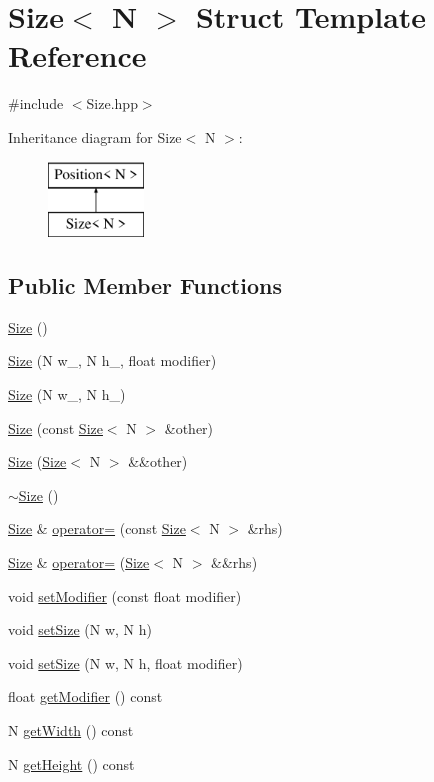 \hypertarget{struct_size}{\section{Size$<$ N $>$ Struct Template Reference}
\label{struct_size}
}


{\ttfamily \#include $<$Size.\-hpp$>$}

Inheritance diagram for Size$<$ N $>$\-:\begin{figure}[H]
\begin{center}
\leavevmode
\includegraphics[height=2.000000cm]{struct_size}
\end{center}
\end{figure}
\subsection*{Public Member Functions}
\begin{DoxyCompactItemize}
\item 
\hyperlink{struct_size_af17421be7acae6d13fc4670f04854de6}{Size} ()
\item 
\hyperlink{struct_size_abf87d26cd771b7fa7b7e3f37acd3e076}{Size} (N w\-\_\-, N h\-\_\-, float modifier)
\item 
\hyperlink{struct_size_aebc8ee17587db4f84c8d9085f27a761d}{Size} (N w\-\_\-, N h\-\_\-)
\item 
\hyperlink{struct_size_ae90aed86840a6650d6ee3d5897afe148}{Size} (const \hyperlink{struct_size}{Size}$<$ N $>$ \&other)
\item 
\hyperlink{struct_size_a31ee38aed5f689000e9fb7415b2f60ce}{Size} (\hyperlink{struct_size}{Size}$<$ N $>$ \&\&other)
\item 
\hyperlink{struct_size_a5a4e62203d653f23e3d88e966b86e3a5}{$\sim$\-Size} ()
\item 
\hyperlink{struct_size}{Size} \& \hyperlink{struct_size_aa0067a04662b093f532b9ebec3175f66}{operator=} (const \hyperlink{struct_size}{Size}$<$ N $>$ \&rhs)
\item 
\hyperlink{struct_size}{Size} \& \hyperlink{struct_size_a7837d5a7b300e0e0052d21e8638361b1}{operator=} (\hyperlink{struct_size}{Size}$<$ N $>$ \&\&rhs)
\item 
void \hyperlink{struct_size_a923481b9729ecc21e249f957049f5d75}{set\-Modifier} (const float modifier)
\item 
void \hyperlink{struct_size_a0893fda3a27cd8bb3e232aa075bfb3cb}{set\-Size} (N w, N h)
\item 
void \hyperlink{struct_size_a402405c7c280000893b3afb4a6bfcce8}{set\-Size} (N w, N h, float modifier)
\item 
float \hyperlink{struct_size_a350abccbfe5b544af3fd6f9c2f50efdb}{get\-Modifier} () const 
\item 
N \hyperlink{struct_size_a80f33b91ecc82d4cf95bc00b1a9406f0}{get\-Width} () const 
\item 
N \hyperlink{struct_size_a403711af30722f363b175bc83dcbcc44}{get\-Height} () const 
\end{DoxyCompactItemize}
